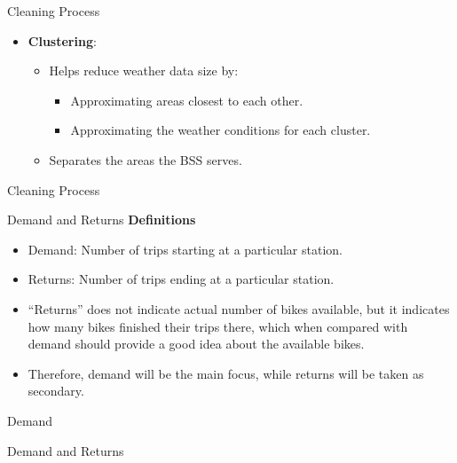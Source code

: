 \documentclass[
  ignorenonframetext,
]{beamer}
\providecommand{\tightlist}{%
  \setlength{\itemsep}{0pt}\setlength{\parskip}{0pt}}
\begin{document}
\begin{frame}{Cleaning Process}
\protect\hypertarget{cleaning-process-3}{}
\begin{itemize}
\tightlist
\item
  \textbf{Clustering}:

  \begin{itemize}
  \tightlist
  \item
    Helps reduce weather data size by:

    \begin{itemize}
    \tightlist
    \item
      Approximating areas closest to each other.
    \item
      Approximating the weather conditions for each cluster.
    \end{itemize}
  \item
    Separates the areas the BSS serves.
  \end{itemize}
\end{itemize}
\end{frame}

\begin{frame}{Cleaning Process}
\protect\hypertarget{cleaning-process-4}{}
\end{frame}

\begin{frame}{Demand and Returns}
\protect\hypertarget{demand-and-returns}{}
\textbf{Definitions}

\begin{itemize}
\tightlist
\item
  Demand: Number of trips starting at a particular station.
\item
  Returns: Number of trips ending at a particular station.
\item
  ``Returns'' does not indicate actual number of bikes available, but it
  indicates how many bikes finished their trips there, which when
  compared with demand should provide a good idea about the available
  bikes.
\item
  Therefore, demand will be the main focus, while returns will be taken
  as secondary.
\end{itemize}
\end{frame}

\begin{frame}{Demand}
\protect\hypertarget{demand}{}
\end{frame}

\begin{frame}{Demand and Returns}
\protect\hypertarget{demand-and-returns-1}{}
\end{frame}
\end{document}

